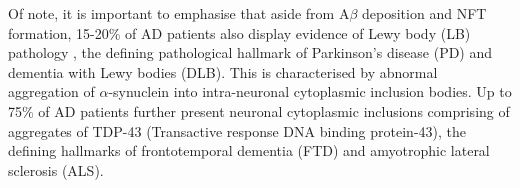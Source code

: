 Of note, it is important to emphasise that aside from A$\beta$ deposition and NFT formation, 15-20\% of AD patients also display evidence of Lewy body (LB) pathology \cite{C1995,L2003}, the defining pathological hallmark of Parkinson's disease (PD)\cite{Wakabayashi2007} and dementia with Lewy bodies (DLB)\cite{Spillantini1997}. This is characterised by abnormal aggregation of $\alpha$-synuclein into intra-neuronal cytoplasmic inclusion bodies. Up to 75\% of AD patients further present neuronal cytoplasmic inclusions comprising of aggregates of TDP-43 \cite{King2010,McAleese2017,Arai2009} (Transactive response DNA binding protein-43), the defining hallmarks of frontotemporal dementia (FTD) and amyotrophic lateral sclerosis\cite{Pesiridis2009} (ALS).

